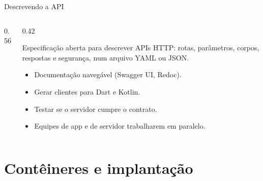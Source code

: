 \documentclass[aspectratio=169,10pt]{beamer}
\begin{document}
\begin{frame}[fragile]{Descrevendo a API}
  \begin{columns}[T]
    \begin{column}{0.56\textwidth}
    \end{column}
    \begin{column}{0.42\textwidth}
      \begin{definicao}[OpenAPI]
        Especificação aberta para descrever APIs HTTP: rotas, parâmetros, corpos, respostas e segurança, num arquivo YAML ou JSON.
      \end{definicao}
      \begin{conceito}
        \begin{itemize}
          \item Documentação navegável (Swagger UI, Redoc).
          \item Gerar clientes para Dart e Kotlin.
          \item Testar se o servidor cumpre o contrato.
          \item Equipes de app e de servidor trabalharem em paralelo.
        \end{itemize}
      \end{conceito}
    \end{column}
  \end{columns}
\end{frame}

\section{Contêineres e implantação}
\end{document}

